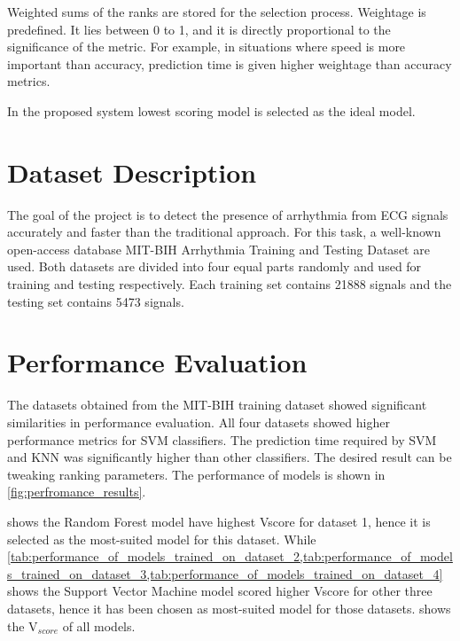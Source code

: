 Weighted sums of the ranks are stored for the selection process. Weightage is predefined. It lies between 0 to 1, and it is directly proportional to the significance of the metric. For example, in situations where speed is more important than accuracy, prediction time is given higher weightage than accuracy metrics.

In the proposed system lowest scoring model is selected as the ideal model.

\section{Dataset Description} \label{sec:dataset_description}
The goal of the project is to detect the presence of arrhythmia from ECG signals accurately and faster than the traditional approach. For this task, a well-known open-access database MIT-BIH Arrhythmia Training and Testing Dataset are used. Both datasets are divided into four equal parts randomly and used for training and testing respectively. Each training set contains 21888 signals and the testing set contains 5473 signals.

\section{Performance Evaluation} \label{sec:performance_evaluation}
The datasets obtained from the MIT-BIH training dataset showed significant similarities in performance evaluation. All four datasets showed higher performance metrics for SVM classifiers. The prediction time required by SVM and KNN was significantly higher than other classifiers. The desired result can be tweaking ranking parameters. The performance of models is shown in \cref{fig:perfromance_results}.

 shows the Random Forest model have highest Vscore for dataset 1, hence it is selected as the most-suited model for this dataset. While \cref{tab:performance_of_models_trained_on_dataset_2,tab:performance_of_models_trained_on_dataset_3,tab:performance_of_models_trained_on_dataset_4} shows the Support Vector Machine model scored higher Vscore for other three datasets, hence it has been chosen as most-suited model for those datasets.  shows the V$_{score}$ of all models.

